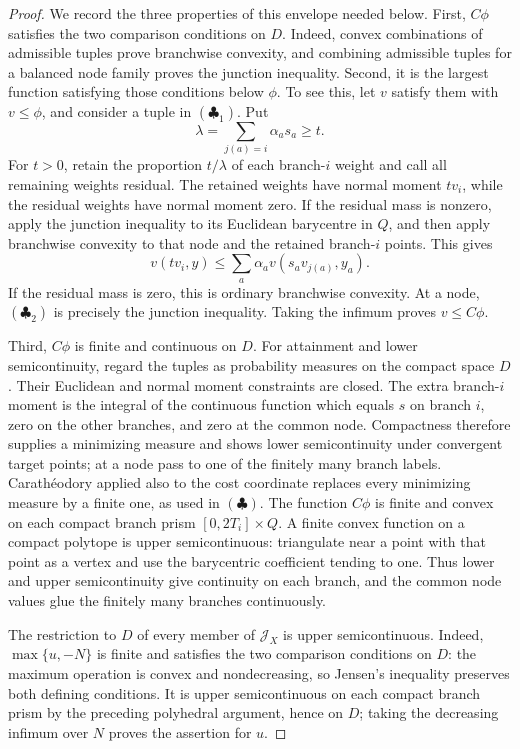 \begin{proof}
We record the three properties of this envelope needed below.  First,
\(C\phi\) satisfies the two comparison conditions on \(D\).  Indeed,
convex combinations of admissible tuples prove branchwise convexity, and
combining admissible tuples for a balanced node family proves the junction
inequality.  Second, it is the largest function satisfying those conditions
below \(\phi\).  To see this, let \(v\) satisfy them with \(v\leq\phi\),
and consider a tuple in
\((\clubsuit_1)\).  Put
\[
               \lambda=\sum_{j(a)=i}\alpha_as_a\geq t.
\]
For \(t>0\), retain the proportion \(t/\lambda\) of each branch-\(i\)
weight and call all remaining weights residual.  The retained weights have
normal moment \(tv_i\), while the residual weights have normal moment zero.
If the residual mass is nonzero, apply the junction inequality to its
Euclidean barycentre in \(Q\), and then apply branchwise convexity to that
node and the retained branch-\(i\) points.  This gives
\[
                  v(tv_i,y)\leq
                  \sum_a\alpha_av(s_av_{j(a)},y_a).
 \tag{\(\clubsuit_2\)}
\]
If the residual mass is zero, this is ordinary branchwise convexity.  At a
node, \((\clubsuit_2)\) is precisely the junction inequality.  Taking the
infimum proves \(v\leq C\phi\).

Third, \(C\phi\) is finite and continuous on \(D\).  For attainment and
lower semicontinuity, regard the tuples as probability measures on the
compact space \(D\).  Their Euclidean and normal moment constraints are
closed.  The extra branch-\(i\) moment is the integral of the continuous
function which equals \(s\) on branch \(i\), zero on the other branches,
and zero at the common node.  Compactness therefore supplies a minimizing
measure and shows lower semicontinuity under convergent target points; at a
node pass to one of the finitely many branch labels.  Carath\'eodory applied
also to the cost coordinate replaces every minimizing measure by a finite
one, as used in \((\clubsuit)\).  The function \(C\phi\) is finite and
convex on each compact branch prism \([0,2T_i]\times Q\).  A finite convex
function on a compact polytope is upper semicontinuous: triangulate near a
point with that point as a vertex and use the barycentric coefficient tending
to one.  Thus lower and upper semicontinuity give continuity on each branch,
and the common node values glue the finitely many branches continuously.

The restriction to \(D\) of every member of \(\mathcal J_X\) is upper
semicontinuous.  Indeed, \(\max\{u,-N\}\) is finite and satisfies the two
comparison conditions on \(D\): the maximum operation is convex and
nondecreasing, so Jensen's inequality preserves both defining conditions.
It is upper semicontinuous on each compact branch prism by the preceding
polyhedral argument, hence on \(D\); taking the decreasing infimum over
\(N\) proves the assertion for \(u\).


\end{proof}
